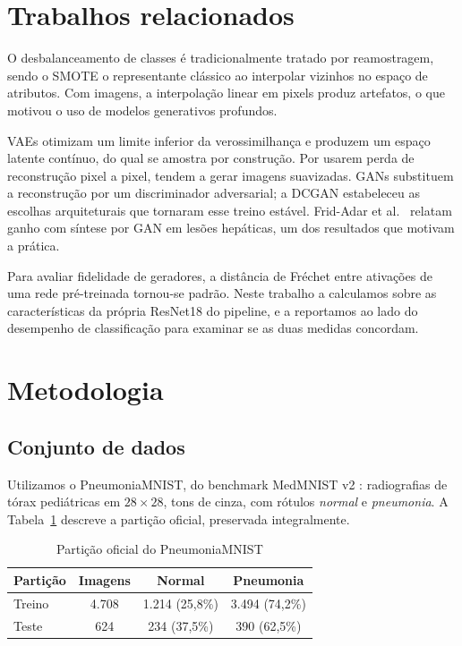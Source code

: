 \documentclass[conference]{IEEEtran}
\begin{document}
\section{Trabalhos relacionados}

O desbalanceamento de classes é tradicionalmente tratado por reamostragem,
sendo o SMOTE \cite{chawla2002smote} o representante clássico ao interpolar
vizinhos no espaço de atributos. Com imagens, a interpolação linear em pixels
produz artefatos, o que motivou o uso de modelos generativos profundos.

VAEs \cite{kingma2014vae} otimizam um limite inferior da verossimilhança e
produzem um espaço latente contínuo, do qual se amostra por construção. Por
usarem perda de reconstrução pixel a pixel, tendem a gerar imagens suavizadas.
GANs \cite{goodfellow2014gan} substituem a reconstrução por um discriminador
adversarial; a DCGAN \cite{radford2016dcgan} estabeleceu as escolhas
arquiteturais que tornaram esse treino estável. Frid-Adar et
al.~\cite{frid2018gan} relatam ganho com síntese por GAN em lesões hepáticas,
um dos resultados que motivam a prática.

Para avaliar fidelidade de geradores, a distância de Fréchet entre ativações de
uma rede pré-treinada \cite{heusel2017fid} tornou-se padrão. Neste trabalho a
calculamos sobre as características da própria ResNet18 do pipeline, e a
reportamos ao lado do desempenho de classificação para examinar se as duas
medidas concordam.

\section{Metodologia}

\subsection{Conjunto de dados}

Utilizamos o PneumoniaMNIST, do benchmark MedMNIST v2 \cite{yang2023medmnist}:
radiografias de tórax pediátricas em $28 \times 28$, tons de cinza, com rótulos
\emph{normal} e \emph{pneumonia}. A Tabela~\ref{tab:dados} descreve a partição
oficial, preservada integralmente.

\begin{table}[t]
\centering
\caption{Partição oficial do PneumoniaMNIST}
\label{tab:dados}
\begin{tabular}{lccc}
\toprule
Partição & Imagens & Normal & Pneumonia \\
\midrule
Treino & 4.708 & 1.214 (25,8\%) & 3.494 (74,2\%) \\
Teste  & 624   & 234 (37,5\%)   & 390 (62,5\%)   \\
\bottomrule
\end{tabular}
\end{table}
\end{document}
